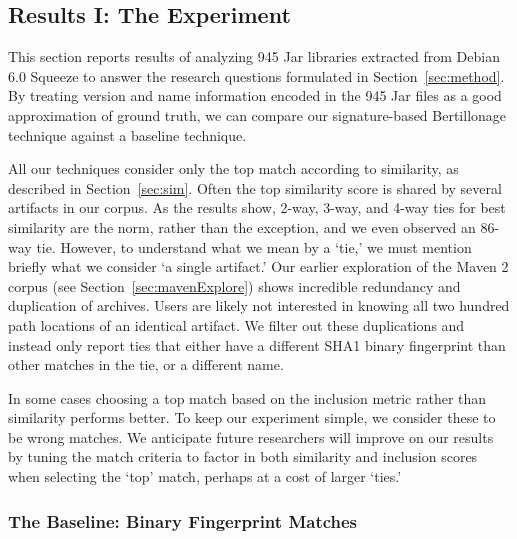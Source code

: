 
\subsection{Results I:  The Experiment}

\label{sec:results}

This section reports results of analyzing 945 Jar libraries extracted
from Debian 6.0 Squeeze to answer the research questions formulated in
Section~\ref{sec:method}.  By treating version and name information
encoded in the 945 Jar files as a good approximation of ground truth,
we can compare our signature-based Bertillonage technique against a
baseline technique.

All our techniques consider only the top match according to similarity,
as described in Section~\ref{sec:sim}.  Often the top similarity score
is shared by several artifacts in our corpus.  As the results show, 2-way,
3-way, and 4-way ties for best similarity are the norm, rather than the
exception, and we even observed an 86-way tie.  However, to understand
what we mean by a `tie,' we must mention briefly what we consider `a single
artifact.'  Our earlier exploration of the Maven 2 corpus (see
Section~\ref{sec:mavenExplore}) shows incredible redundancy and duplication
of archives.  Users are likely not interested in knowing all two hundred
path locations of an identical artifact.  We filter out these duplications
and instead only report ties that either have a different SHA1 binary
fingerprint than other matches in the tie, or a different name.  

In some cases choosing a top match based on the inclusion metric rather
than similarity performs better.  To keep our experiment simple, we
consider these to be wrong matches.  We anticipate future researchers
will improve on our results by tuning the match criteria to factor in
both similarity and inclusion scores when selecting the `top' match,
perhaps at a cost of larger `ties.'


\subsubsection{The Baseline:  Binary Fingerprint Matches}

